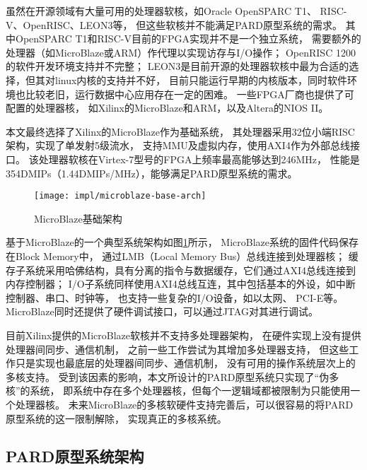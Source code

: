 虽然在开源领域有大量可用的处理器软核，如Oracle OpenSPARC T1\cite{sparct1}、
RISC-V\cite{riscv}、OpenRISC\cite{or1k}、LEON3\cite{leon3}等，
但这些软核并不能满足PARD原型系统的需求。
其中OpenSPARC T1和RISC-V目前的FPGA实现并不是一个独立系统，
需要额外的处理器（如MicroBlaze或ARM）作代理以实现访存与I/O操作；
OpenRISC 1200的软件开发环境支持并不完整；
LEON3是目前开源的处理器软核中最为合适的选择，但其对linux内核的支持并不好，
目前只能运行早期的内核版本，同时软件环境也比较老旧，运行数据中心应用存在一定的困难。
一些FPGA厂商也提供了可配置的处理器核，
如Xilinx的MicroBlaze\cite{microblaze}和ARM\cite{zynq}，以及Altera的NIOS II\cite{niosii}。

本文最终选择了Xilinx的MicroBlaze作为基础系统，
其处理器采用32位小端RISC架构，实现了单发射5级流水，
支持MMU及虚拟内存，使用AXI4作为外部总线接口\cite{microblaze-ref}。
该处理器软核在Virtex-7型号的FPGA上频率最高能够达到246MHz，
性能是354DMIPs（1.44DMIPs/MHz）\cite{microblaze}，能够满足PARD原型系统的需求。

\begin{figure}[tb]
  \centering
  \texttt{[image: impl/microblaze-base-arch]}
  \caption{MicroBlaze基础架构}
  \label{fig:microblaze-base-arch}
\end{figure}


基于MicroBlaze的一个典型系统架构如图\ref{fig:microblaze-base-arch}所示，
MicroBlaze系统的固件代码保存在Block Memory中，
通过LMB（Local Memory Bus）总线连接到处理器核；
缓存子系统采用哈佛结构，具有分离的指令与数据缓存，它们通过AXI4总线连接到内存控制器；
I/O子系统同样使用AXI4总线互连，其中包括基本的外设，如中断控制器、串口、时钟等，
也支持一些复杂的I/O设备，如以太网\cite{axi-ethernet-subsystem}、
PCI-E\cite{axi-pcie-bridge}等。
MicroBlaze同时还提供了硬件调试接口，可以通过JTAG对其进行调试。

目前Xilinx提供的MicroBlaze软核并不支持多处理器架构，
在硬件实现上没有提供处理器间同步、通信机制，
之前一些工作\cite{microblaze-mp-rsp08,microblaze-mp-xapp}尝试为其增加多处理器支持，
但这些工作只是实现也最底层的处理器间同步、通信机制，
没有可用的操作系统层次上的多核支持。
受到该因素的影响，本文所设计的PARD原型系统只实现了``伪多核''的系统，
即系统中存在多个处理器核，但每个一逻辑域都被限制为只能使用一个处理器核。
未来MicroBlaze的多核软硬件支持完善后，可以很容易的将PARD原型系统的这一限制解除，
实现真正的多核系统。


\subsection{PARD原型系统架构}

